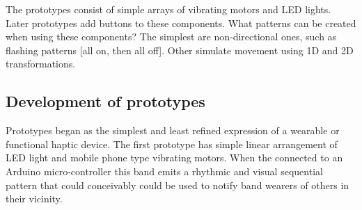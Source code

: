 \documentclass{chi-ext}
\begin{document}
The prototypes consist of simple arrays of vibrating motors and LED lights. Later prototypes add buttons to these components. What patterns can be created when using these components? The simplest are non-directional ones, such as flashing patterns [all on, then all off]. Other simulate movement using 1D and 2D transformations.




\subsection{Development of prototypes}
Prototypes began as the simplest and least refined expression of a wearable or functional haptic device. The first prototype has simple linear arrangement of LED light and mobile phone type vibrating motors. When the connected to an Arduino micro-controller this band emits a rhythmic and visual sequential pattern that could conceivably could be used to notify band wearers of others in their vicinity. 
\end{document}
